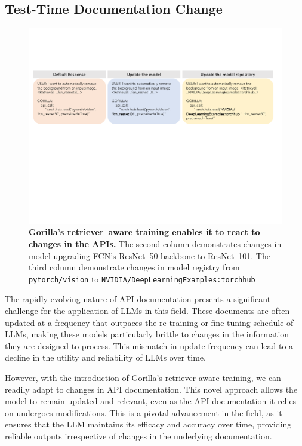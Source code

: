 \subsection{Test-Time Documentation Change}

\begin{figure}[t]
    \includegraphics[width=\linewidth]{figures/docu.pdf}
\caption{\footnotesize \textbf{Gorilla's retriever\---aware training enables it to react to changes in the APIs.} The second column demonstrates changes in model \- upgrading FCN's ResNet\---50 backbone to ResNet\---101. The third column demonstrate changes in model registry from \texttt{pytorch/vision} to \texttt{NVIDIA/DeepLearningExamples:torchhub} }
\label{fig:docu}
\end{figure}


The rapidly evolving nature of API documentation presents a significant challenge for the application of LLMs in this field. These documents are often updated at a frequency that outpaces the re-training or fine-tuning schedule of LLMs, making these models particularly brittle to changes in the information they are designed to process. This mismatch in update frequency can lead to a decline in the utility and reliability of LLMs over time.

However, with the introduction of Gorilla's retriever-aware training, we can readily adapt to changes in API documentation. This novel approach allows the model to remain updated and relevant, even as the API documentation it relies on undergoes modifications. This is a pivotal advancement in the field, as it ensures that the LLM maintains its efficacy and accuracy over time, providing reliable outputs irrespective of changes in the underlying documentation.

